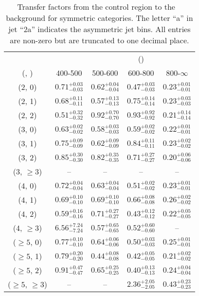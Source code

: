 \begin{table}[h!]
\tiny
\centering
\caption{Transfer factors from the \gj control region to the \zInv~ background for symmetric categories. The letter ``a'' in jet \eg ``2a''  indicates the asymmetric jet bins. All entries are non-zero but are truncated to one decimal place.\label{tab:tf_gj_zinv_sym}}
\begin{tabular}
{ccccc}
	\hline\hline
&	& \multicolumn{4}{c}{\scalht (\gev)} \\ 
	 (\njet,  \nb) & 400-500 & 500-600 & 600-800 & 800-$\infty$ \\ [0.8ex] 
\hline
	(2, 0) & $0.71^{+ 0.03 }_{- 0.03 }$ & $0.62^{+ 0.04 }_{- 0.04 }$ & $0.47^{+ 0.03 }_{- 0.03 }$ & $0.23^{+ 0.01 }_{- 0.01 }$ \\[0.5ex] 
	(2, 1) & $0.68^{+ 0.11 }_{- 0.11 }$ & $0.57^{+ 0.13 }_{- 0.13 }$ & $0.75^{+ 0.14 }_{- 0.14 }$ & $0.23^{+ 0.03 }_{- 0.03 }$ \\[0.5ex] 
	(2, 2) & $0.51^{+ 0.32 }_{- 0.32 }$ & $0.92^{+ 0.70 }_{- 0.70 }$ & $0.93^{+ 0.92 }_{- 0.92 }$ & $0.21^{+ 0.14 }_{- 0.14 }$ \\[0.5ex] 
	(3, 0) & $0.63^{+ 0.02 }_{- 0.02 }$ & $0.58^{+ 0.03 }_{- 0.03 }$ & $0.59^{+ 0.02 }_{- 0.02 }$ & $0.22^{+ 0.01 }_{- 0.01 }$ \\[0.5ex] 
	(3, 1) & $0.75^{+ 0.09 }_{- 0.09 }$ & $0.62^{+ 0.09 }_{- 0.09 }$ & $0.84^{+ 0.11 }_{- 0.11 }$ & $0.23^{+ 0.02 }_{- 0.02 }$ \\[0.5ex] 
	(3, 2) & $0.85^{+ 0.30 }_{- 0.30 }$ & $0.82^{+ 0.35 }_{- 0.35 }$ & $0.71^{+ 0.27 }_{- 0.27 }$ & $0.20^{+ 0.06 }_{- 0.06 }$ \\[0.5ex] 
	(3, $\ge3$) & -- & -- & -- & -- \\[0.5ex] 
	(4, 0) & $0.72^{+ 0.04 }_{- 0.04 }$ & $0.63^{+ 0.04 }_{- 0.04 }$ & $0.51^{+ 0.02 }_{- 0.02 }$ & $0.23^{+ 0.01 }_{- 0.01 }$ \\[0.5ex] 
	(4, 1) & $0.69^{+ 0.10 }_{- 0.10 }$ & $0.69^{+ 0.10 }_{- 0.10 }$ & $0.66^{+ 0.08 }_{- 0.08 }$ & $0.26^{+ 0.02 }_{- 0.02 }$ \\[0.5ex] 
	(4, 2) & $0.59^{+ 0.16 }_{- 0.16 }$ & $0.71^{+ 0.27 }_{- 0.27 }$ & $0.43^{+ 0.12 }_{- 0.12 }$ & $0.22^{+ 0.05 }_{- 0.05 }$ \\[0.5ex] 
	(4, $\ge3$) & $6.56^{+ 7.24 }_{- 7.24 }$ & $0.57^{+ 0.65 }_{- 0.65 }$ & $0.52^{+ 0.60 }_{- 0.60 }$ & -- \\[0.5ex] 
	($\ge5$, 0) & $0.77^{+ 0.10 }_{- 0.10 }$ & $0.64^{+ 0.06 }_{- 0.06 }$ & $0.50^{+ 0.03 }_{- 0.03 }$ & $0.25^{+ 0.01 }_{- 0.01 }$ \\[0.5ex] 
	($\ge5$, 1) & $0.79^{+ 0.20 }_{- 0.20 }$ & $0.44^{+ 0.08 }_{- 0.08 }$ & $0.42^{+ 0.05 }_{- 0.05 }$ & $0.21^{+ 0.02 }_{- 0.02 }$ \\[0.5ex] 
	($\ge5$, 2) & $0.91^{+ 0.47 }_{- 0.47 }$ & $0.65^{+ 0.25 }_{- 0.25 }$ & $0.40^{+ 0.13 }_{- 0.13 }$ & $0.24^{+ 0.04 }_{- 0.04 }$ \\[0.5ex] 
	($\ge5$, $\ge3$) & -- & -- & $2.36^{+ 2.05 }_{- 2.05 }$ & $0.43^{+ 0.23 }_{- 0.23 }$ \\[0.5ex] 
	\hline
	\hline
\end{tabular}
\end{table}
